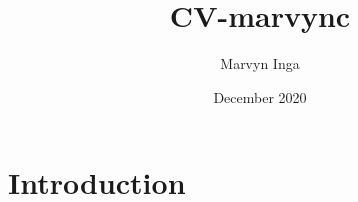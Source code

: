\documentclass{article}
\title{CV-marvync}
\author{Marvyn Inga}
\date{December 2020}
\begin{document}
\maketitle

\section{Introduction}
\end{document}
